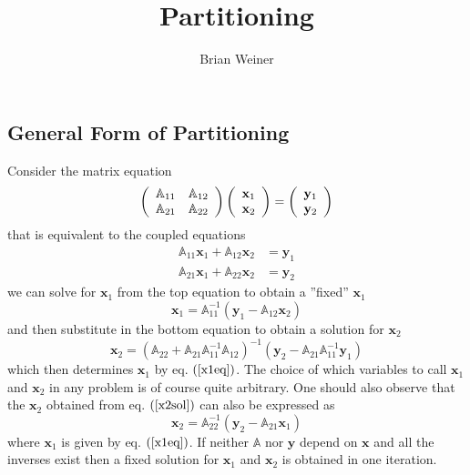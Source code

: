 \documentclass[aps,preprint]{revtex4}%
\begin{document}
\preprint{ }
\title[ ]{Partitioning }
\author{Brian Weiner}
\maketitle
\tableofcontents


\subsection{General Form of Partitioning}

Consider the matrix equation
\begin{equation}
\left(
\begin{array}
[c]{cc}%
\mathbb{A}_{11} & \mathbb{A}_{12}\\
\mathbb{A}_{21} & \mathbb{A}_{22}%
\end{array}
\right)  \left(
\begin{array}
[c]{c}%
\mathbf{x}_{1}\\
\mathbf{x}_{2}%
\end{array}
\right)  =\left(
\begin{array}
[c]{c}%
\mathbf{y}_{1}\\
\mathbf{y}_{2}%
\end{array}
\right)  \label{ME1}%
\end{equation}
that is equivalent to the coupled equations
\begin{align}
\mathbb{A}_{11}\mathbf{x}_{1}+\mathbb{A}_{12}\mathbf{x}_{2}  &  =\mathbf{y}%
_{1}\nonumber\\
\mathbb{A}_{21}\mathbf{x}_{1}+\mathbb{A}_{22}\mathbf{x}_{2}  &  =\mathbf{y}%
_{2}%
\end{align}
we can solve for $\mathbf{x}_{1}$ from the top equation to obtain a ''fixed''
$\mathbf{x}_{1}$
\begin{equation}
\mathbf{x}_{1}=\mathbb{A}_{11}^{-1}\left(  \mathbf{y}_{1}-\mathbb{A}%
_{12}\mathbf{x}_{2}\right)  \label{x1eq}%
\end{equation}
and then substitute in the bottom equation to obtain a solution for
$\mathbf{x}_{2}$
\begin{equation}
\mathbf{x}_{2}=\left(  \mathbb{A}_{22}+\mathbb{A}_{21}\mathbb{A}_{11}%
^{-1}\mathbb{A}_{12}\right)  ^{-1}\left(  \mathbf{y}_{2}-\mathbb{A}%
_{21}\mathbb{A}_{11}^{-1}\mathbf{y}_{1}\right)  \label{x2sol}%
\end{equation}
which then determines $\mathbf{x}_{1}$ by eq. $\left(  \ref{x1eq}\right)  $.
The choice of which variables to call $\mathbf{x}_{1}$ and $\mathbf{x}_{2}$ in
any problem is of course quite arbitrary. One should also observe that the
$\mathbf{x}_{2}$ obtained from eq. $\left(  \ref{x2sol}\right)  $ can also be
expressed as
\begin{equation}
\mathbf{x}_{2}=\mathbb{A}_{22}^{-1}\left(  \mathbf{y}_{2}-\mathbb{A}%
_{21}\mathbf{x}_{1}\right)  \label{x2leq}%
\end{equation}
where $\mathbf{x}_{1}$ is given by eq. $\left(  \ref{x1eq}\right)  $. If
neither $\mathbb{A}$ nor $\mathbf{y}$ depend on $\mathbf{x}$ and all the
inverses exist then a fixed solution for $\mathbf{x}_{1}$ and $\mathbf{x}_{2}$
is obtained in one iteration.
\end{document}
